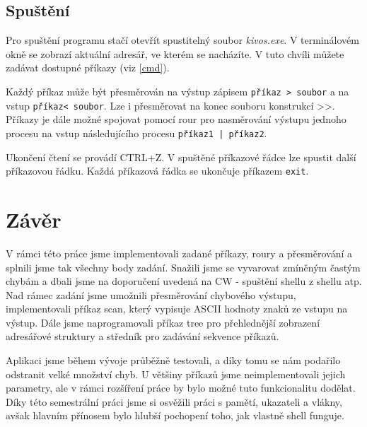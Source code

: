 \documentclass[a4paper]{article}
\begin{document}
\subsection{Spuštění}
Pro spuštění programu stačí otevřít spustitelný soubor \emph{kivos.exe}. V terminálovém okně se zobrazí aktuální adresář, ve kterém se nacházíte. V tuto chvíli můžete zadávat dostupné příkazy (viz \ref{cmd}).


Každý příkaz může být přesměrován na výstup zápisem  \verb+příkaz > soubor+ a na vstup  \verb+příkaz< soubor+. Lze i přesměrovat na konec souboru konstrukcí \textgreater\textgreater. Příkazy je dále možné spojovat pomocí rour pro nasměrování výstupu jednoho procesu na vstup následujícího procesu  \verb+příkaz1 | příkaz2+.

Ukončení čtení se provádí CTRL+Z. 
V spuštěné příkazové řádce lze spustit další příkazovou řádku. Každá příkazová řádka se ukončuje příkazem \verb+exit+. 



\section{Závěr}

V rámci této práce jsme implementovali zadané příkazy, roury a přesměrování a splnili jsme tak všechny body zadání. Snažili jsme se vyvarovat zmíněným častým chybám a dbali jsme na doporučení uvedená na CW - spuštění shellu z shellu atp. Nad rámec zadání jsme umožnili přesměrování chybového výstupu,  implementovali příkaz scan, který vypisuje ASCII hodnoty znaků ze vstupu na výstup. Dále jsme naprogramovali příkaz tree pro přehlednější zobrazení adresářové struktury a středník pro zadávání sekvence příkazů.

Aplikaci jsme během vývoje průběžně testovali, a díky tomu se nám podařilo odstranit velké množství chyb. U většiny příkazů jsme neimplementovali jejich parametry, ale v rámci rozšíření práce by bylo možné tuto funkcionalitu dodělat.
Díky této semestrální práci jsme si osvěžili práci s pamětí, ukazateli a vlákny, avšak hlavním přínosem bylo hlubší pochopení toho, jak vlastně shell funguje.
\end{document}
